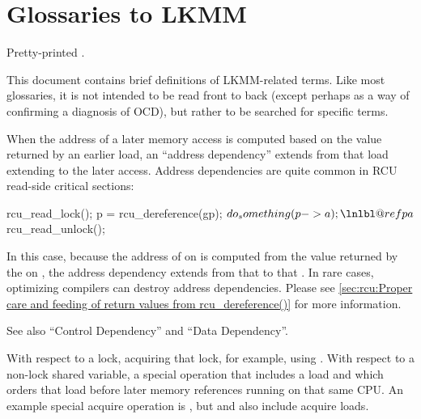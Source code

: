 \section{Glossaries to LKMM}
\label{sec:docs:Glossaries to LKMM}

\begin{Note}
  Pretty-printed .
\end{Note}

This document contains brief definitions of LKMM-related terms.
Like most glossaries, it is not intended to be read front to back
(except perhaps as a way of confirming a diagnosis of OCD), but rather
to be searched for specific terms.

\begin{description}[style=nextline]
  \item[Address Dependency:]
	When the address of a later memory access is computed
	based on the value returned by an earlier load, an ``address
	dependency'' extends from that load extending to the later access.
	Address dependencies are quite common in RCU read-side critical
	sections:

\begin{fcvlabel}
\begin{VerbatimN}[commandchars=\\\@\$]
	rcu_read_lock();
	p = rcu_dereference(gp);    \lnlbl@rcuderef$
	do_something(p->a);    \lnlbl@refpa$
	rcu_read_unlock();
\end{VerbatimN}
\end{fcvlabel}
        
	\begin{fcvref}
	In this case, because the address of  on 
	is computed from the value returned by the 
	on , the address dependency extends from that
	 to that .
	In rare cases, optimizing compilers can destroy address dependencies.
	Please see \cref{sec:rcu:Proper care and feeding of return values from rcu_dereference()}
	for more information.
        \end{fcvref}

	See also ``Control Dependency'' and ``Data Dependency''.

      \item[Acquire:]
	With respect to a lock, acquiring that lock, for example,
	using .
	With respect to a non-lock shared variable, a special operation
	that includes a load and which orders that load before later memory
	references running on that same CPU.
	An example special acquire operation is ,
	but  and 
	also include acquire loads.


\end{description}
